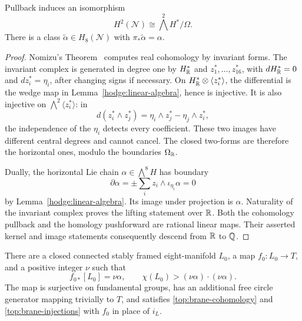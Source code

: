 \begin{lemma}\label{top:nilmanifold}
Pullback induces an isomorphism
\[
 H^2(\mathcal N)\cong \bigwedge^2 H^*/\Omega.
\]
There is a class $\widetilde\alpha\in H_8(\mathcal N)$ with
$\pi_*\widetilde\alpha=\alpha$.
\end{lemma}

\begin{proof}
Nomizu's Theorem~\cite[Theorem~1]{nomizu} computes real cohomology by
invariant forms.  The invariant complex is generated in degree one by
$H^*_{\mathbb R}$ and $z_1^*,\ldots,z_{16}^*$, with
$dH^*_{\mathbb R}=0$ and $dz_i^*=\eta_i$, after changing signs if necessary.
On $H^*_{\mathbb R}\otimes\langle z_i^*\rangle$, the differential is the
wedge map in Lemma~\ref{hodge:linear-algebra}, hence is injective.
It is also injective on $\bigwedge^2\langle z_i^*\rangle$: in
\[
 d(z_i^*\wedge z_j^*)=\eta_i\wedge z_j^*-\eta_j\wedge z_i^*,
\]
the independence of the $\eta_i$ detects every coefficient.  These two
images have different central degrees and cannot cancel.  The closed
two-forms are therefore the horizontal ones, modulo the boundaries
$\Omega_{\mathbb R}$.

Dually, the horizontal Lie chain $\alpha\in\bigwedge^8H$ has boundary
\[
 \partial\alpha=\pm\sum_i z_i\wedge\iota_{\eta_i}\alpha=0
\]
by Lemma~\ref{hodge:linear-algebra}.  Its image under projection is
$\alpha$.  Naturality of the invariant complex proves the lifting
statement over $\mathbb R$.  Both the cohomology pullback and the homology
pushforward are rational linear maps.  Their asserted kernel and image
statements consequently descend from $\mathbb R$ to $\mathbb Q$.
\end{proof}

\begin{lemma}\label{top:framed-source}
There are a closed connected stably framed eight-manifold $L_0$, a map
$f_0:L_0\to T$, and a positive integer $\nu$ such that
\[
 f_{0*}[L_0]=\nu\alpha,\qquad
 \chi(L_0)>(\nu\alpha)\cdot(\nu\alpha).
\]
The map is surjective on fundamental groups, has an additional free
circle generator mapping trivially to $T$, and satisfies
\eqref{top:brane-cohomology} and \eqref{top:brane-injections} with
$f_0$ in place of $i_L$.
\end{lemma}

